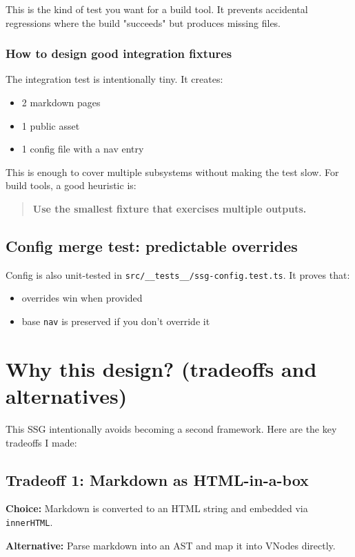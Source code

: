 This is the kind of test you want for a build tool.
It prevents accidental regressions where the build "succeeds" but produces missing files.

\subsubsection{How to design good integration fixtures}
The integration test is intentionally tiny.
It creates:

\begin{itemize}
  \item 2 markdown pages
  \item 1 public asset
  \item 1 config file with a nav entry
\end{itemize}

This is enough to cover multiple subsystems without making the test slow.
For build tools, a good heuristic is:

\begin{quote}
	\textbf{Use the smallest fixture that exercises multiple outputs.}
\end{quote}

\subsection{Config merge test: predictable overrides}
Config is also unit-tested in \texttt{src/\_\_tests\_\_/ssg-config.test.ts}.
It proves that:

\begin{itemize}
  \item overrides win when provided
  \item base \texttt{nav} is preserved if you don't override it
\end{itemize}

\section{Why this design? (tradeoffs and alternatives)}
This SSG intentionally avoids becoming a second framework.
Here are the key tradeoffs I made:

\subsection{Tradeoff 1: Markdown as HTML-in-a-box}
\textbf{Choice:} Markdown is converted to an HTML string and embedded via \texttt{innerHTML}.

\textbf{Alternative:} Parse markdown into an AST and map it into VNodes directly.

